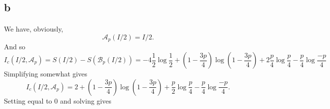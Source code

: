 \documentclass[letterpaper,12pt,oneside,onecolumn]{article}
\newcommand{\cA}{\mathcal{A}} \newcommand{\cB}{\mathcal{B}}
\begin{document}
\subsection{b}
\paragraph{}
We have, obviously, 
$$\cA_p(I/2) = I/2.$$
And so
$$I_c(I/2, \cA_p) = S(I/2) - S(\cB_p(I/2)) = -4\frac{1}{2}\log\frac{1}{2} + (1-\frac{3p}{4})\log(1-\frac{3p}{4}) + 2\frac{p}{4}\log\frac{p}{4} - \frac{p}{4}\log\frac{-p}{4}$$
Simplifying somewhat gives
$$I_c(I/2, \cA_p) = 2 +(1-\frac{3p}{4})\log(1-\frac{3p}{4}) +\frac{p}{2}\log\frac{p}{4} - \frac{p}{4}\log\frac{-p}{4}. $$
Setting equal to $0$ and solving gives
\end{document}
